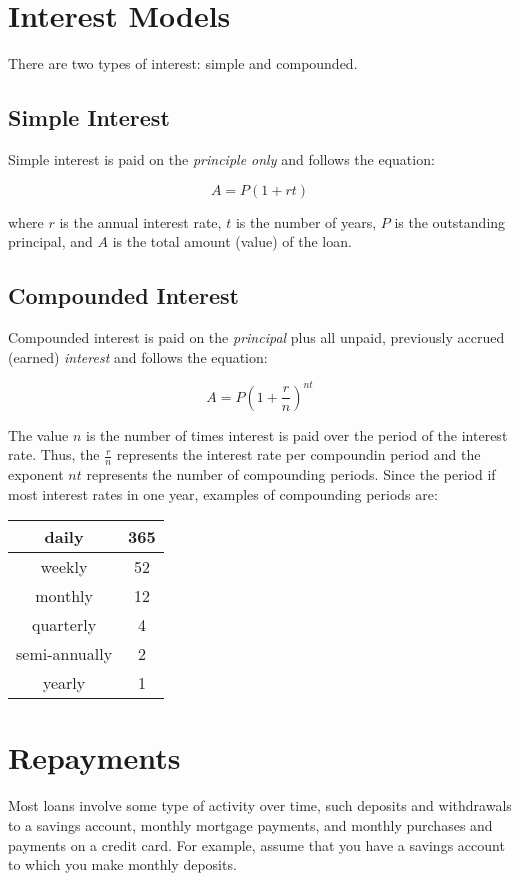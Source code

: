 \documentclass[letterpaper]{article}
\begin{document}
\section*{Interest Models}

There are two types of interest: simple and compounded.

\subsection*{Simple Interest}

Simple interest is paid on the \emph{principle only} and follows the equation:

\[A=P\left(1+rt\right)\]

where $r$ is the annual interest rate, $t$ is the number of years, $P$ is the
outstanding principal, and $A$ is the total amount (value) of the loan.

\subsection*{Compounded Interest}

Compounded interest is paid on the \emph{principal} plus all unpaid, previously
accrued (earned) \emph{interest} and follows the equation:

\[A=P\left(1+\frac{r}{n}\right)^{nt}\]

The value $n$ is the number of times interest is paid over the period of the
interest rate. Thus, the $\frac{r}{n}$ represents the interest rate per
compoundin period and the exponent $nt$ represents the number of compounding
periods.  Since the period if most interest rates in one year, examples
of compounding periods are:

\bigskip

\begin{center}
\begin{tabular}{|c|c|}
\hline
daily & 365 \\
\hline
weekly & 52 \\
\hline
monthly & 12 \\
\hline
quarterly & 4 \\
\hline
semi-annually & 2 \\
\hline
yearly & 1 \\
\hline
\end{tabular}
\end{center}

\bigskip

\section*{Repayments}

Most loans involve some type of activity over time, such deposits and
withdrawals to a savings account, monthly mortgage payments, and monthly
purchases and payments on a credit card. For example, assume that you have a
savings account to which you make monthly deposits.
\end{document}
